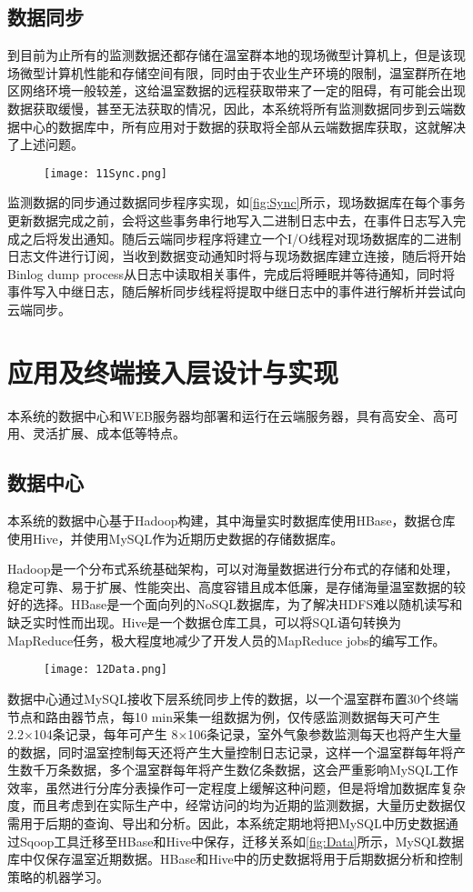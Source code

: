 	\subsection{数据同步}
到目前为止所有的监测数据还都存储在温室群本地的现场微型计算机上，但是该现场微型计算机性能和存储空间有限，同时由于农业生产环境的限制，温室群所在地区网络环境一般较差，这给温室数据的远程获取带来了一定的阻碍，有可能会出现数据获取缓慢，甚至无法获取的情况，因此，本系统将所有监测数据同步到云端数据中心的数据库中，所有应用对于数据的获取将全部从云端数据库获取，这就解决了上述问题。
	\begin{figure}[!htp]
		\centering
		\texttt{[image: 11Sync.png]}
	\end{figure}
监测数据的同步通过数据同步程序实现，如\ref{fig:Sync}所示，现场数据库在每个事务更新数据完成之前，会将这些事务串行地写入二进制日志中去，在事件日志写入完成之后将发出通知。随后云端同步程序将建立一个I/O线程对现场数据库的二进制日志文件进行订阅，当收到数据变动通知时将与现场数据库建立连接，随后将开始Binlog dump process从日志中读取相关事件，完成后将睡眠并等待通知，同时将事件写入中继日志，随后解析同步线程将提取中继日志中的事件进行解析并尝试向云端同步。

\section{应用及终端接入层设计与实现}
	本系统的数据中心和WEB服务器均部署和运行在云端服务器，具有高安全、高可用、灵活扩展、成本低等特点。
	\subsection{数据中心}
本系统的数据中心基于Hadoop构建，其中海量实时数据库使用HBase，数据仓库使用Hive，并使用MySQL作为近期历史数据的存储数据库。

Hadoop是一个分布式系统基础架构，可以对海量数据进行分布式的存储和处理，稳定可靠、易于扩展、性能突出、高度容错且成本低廉，是存储海量温室数据的较好的选择。HBase是一个面向列的NoSQL数据库，为了解决HDFS难以随机读写和缺乏实时性而出现。Hive是一个数据仓库工具，可以将SQL语句转换为MapReduce任务，极大程度地减少了开发人员的MapReduce jobs的编写工作。
	\begin{figure}[!htp]
		\centering
		\texttt{[image: 12Data.png]}
	\end{figure}
数据中心通过MySQL接收下层系统同步上传的数据，以一个温室群布置30个终端节点和路由器节点，每10 min采集一组数据为例，仅传感监测数据每天可产生2.2×104条记录，每年可产生 8×106条记录，室外气象参数监测每天也将产生大量的数据，同时温室控制每天还将产生大量控制日志记录，这样一个温室群每年将产生数千万条数据，多个温室群每年将产生数亿条数据，这会严重影响MySQL工作效率，虽然进行分库分表操作可一定程度上缓解这种问题，但是将增加数据库复杂度，而且考虑到在实际生产中，经常访问的均为近期的监测数据，大量历史数据仅需用于后期的查询、导出和分析。因此，本系统定期地将把MySQL中历史数据通过Sqoop工具迁移至HBase和Hive中保存，迁移关系如\ref{fig:Data}所示，MySQL数据库中仅保存温室近期数据。HBase和Hive中的历史数据将用于后期数据分析和控制策略的机器学习。
 
